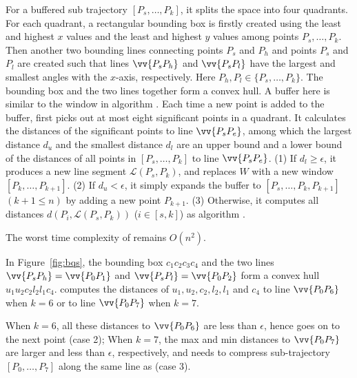 For a buffered sub trajectory $[P_s, \ldots, P_k]$, it splits the space into four quadrants. For each quadrant, a rectangular bounding box is firstly created using the least and highest $x$ values and the least and highest $y$ values among points $P_s,\ldots,P_k$. Then another two bounding lines connecting points $P_s$ and $P_{h}$ and points $P_s$ and $P_{l}$ are created such that lines $\vv{P_sP_{h}}$ and $\vv{P_sP_{l}}$ have the largest and smallest angles with the $x$-axis, respectively.
Here $P_{h},P_{l} \in\{P_s,\ldots,P_k\}$. The bounding box and the two lines together form a convex hull.
A buffer here is similar to the window in algorithm \opwa\cite{Meratnia:Spatiotemporal}.
Each time a new point is added to the buffer, \bqsa first picks out at most eight significant points in a quadrant. It calculates the distances of the significant points to line $\vv{P_sP_e}$, among which the largest distance $d_{u}$ and the smallest distance $d_l$ are an upper bound and  a lower bound of the distances of all points in $[P_s, \ldots, P_k]$ to line $\vv{P_sP_e}$.
(1) If $d_l\ge \epsilon$, it produces a new line segment $\mathcal{L}(P_{s}, P_{k})$, and replaces $W$ with a new window $[P_{k},\ldots,P_{k+1}]$.
(2) If $d_u < \epsilon$, it simply expands the buffer to $[P_s, \ldots, P_k, P_{k+1}]$ $(k+1\le n)$ by adding a new point $P_{k+1}$.
(3) Otherwise, it computes all distances $d(P_i, {\mathcal{L}(P_s,P_k)})$ ($i\in[s, k]$) as algorithm \dpa.

The worst time complexity of \bqsa remains $O(n^2)$.

\begin{example}
\label{exm-alg-bqs}
In Figure~\ref{fig:bqs}, the bounding box $c_1c_2c_3c_4$ and the two lines $\vv{P_sP_{h}} = \vv{P_0P_1}$ and $\vv{P_sP_{l}} = \vv{P_0P_2}$ form a convex hull $u_1u_2c_2l_2l_1c_4$. \bqsa computes the distances of $u_1,u_2,c_2,l_2,l_1$ and $c_4$ to line $\vv{P_0P_6}$ when $k=6$ or to line $\vv{P_0P_7}$ when $k=7$.

When $k=6$, all these distances to $\vv{P_0P_6}$  are less than $\epsilon$, hence \bqsa goes on to the next point (case 2); When $k=7$,
the max and min distances to $\vv{P_0P_7}$ are larger and less than $\epsilon$, respectively, and \bqsa needs to compress sub-trajectory $[P_0, \ldots, P_7]$ along the same line as \dpa (case 3).
\end{example}




